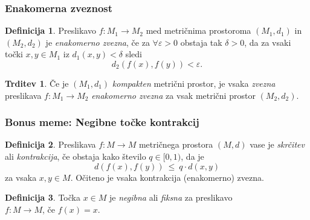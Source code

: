 \documentclass[11pt]{article}
\theoremstyle{definition}
\newtheorem{definicija}{Definicija}[section]
\theoremstyle{definition}
\newtheorem{trditev}{Trditev}[section]
\theoremstyle{definition}
\begin{document}

\subsubsection{Enakomerna zveznost}
\vspace{0.5cm}

\begin{definicija}

Preslikavo $f: M_1 \rightarrow M_2$ med metričnima prostoroma $(M_1, d_1)$ in $(M_2, d_2)$ je \textit{enakomerno zvezna}, če za $\forall \varepsilon > 0$ obstaja tak $\delta > 0$, da za vsaki točki $x, y \in M_1$ iz $d_1(x, y) < \delta$ sledi 
$$d_2(f(x), f(y)) < \varepsilon.$$

\end{definicija}
\vspace{0.5cm}

\begin{trditev}

Če je $(M_1, d_1)$ \textit{kompakten} metrični prostor, je vsaka \textit{zvezna} preslikava $f: M_1 \rightarrow M_2$ \textit{enakomerno zvezna} za vsak metrični prostor $(M_2, d_2)$. 

\end{trditev}
\vspace{0.5cm}


\subsubsection{Bonus meme: Negibne točke kontrakcij}
\vspace{0.5cm}

\begin{definicija}

Preslikava $f: M \rightarrow M$ metričnega prostora $(M, d)$ vase je \textit{skrčitev} ali \textit{kontrakcija}, če obstaja kako število $q \in [0, 1)$, da je
$$d(f(x), f(y)) ~\leq~ q \cdot d(x, y)$$
za vsaka $x, y \in M$. Očiteno je vsaka kontrakcija (enakomerno) zvezna.

\end{definicija}
\vspace{0.5cm}

\begin{definicija}

Točka $x \in M$ je \textit{negibna} ali \textit{fiksna} za preslikavo \\$f: M \rightarrow M$, če $f(x) = x$.

\end{definicija}
\vspace{0.5cm}
\end{document}
